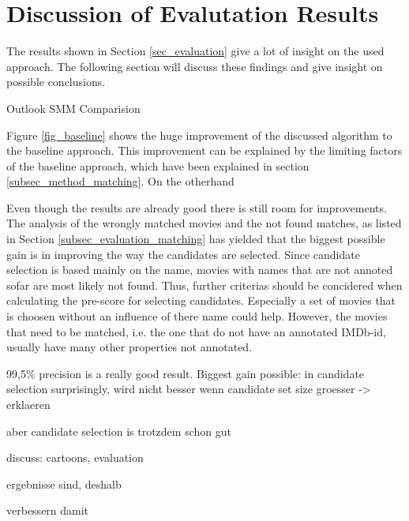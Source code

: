 \section{Discussion of Evalutation Results}
\label{sec_discussion}

The results shown in Section \ref{sec_evaluation} give a lot of insight on the used approach.
The following section will discuss these findings and give insight on possible conclusions.

Outlook SMM Comparision

Figure \ref{fig_baseline} shows the huge improvement of the discussed algorithm to the baseline approach.
This improvement can be explained by the limiting factors of the baseline approach, which have been explained in section \ref{subsec_method_matching}.
On the otherhand

Even though the results are already good there is still room for improvements.
The analysis of the wrongly matched movies and the not found matches, as listed in Section \ref{subsec_evaluation_matching} has yielded that the biggest possible gain is in improving the way the candidates are selected.
Since candidate selection is based mainly on the name, movies with names that are not annoted sofar are most likely not found.
Thus, further criterias should be concidered when calculating the pre-score for selecting candidates.
Especially a set of movies that is choosen without an influence of there name could help.
However, the movies that need to be matched, i.e. the one that do not have an annotated IMDb-id, usually have many other properties not annotated.

99,5\% precision is a really good result.
Biggest gain possible: in candidate selection
surprisingly, wird nicht besser wenn candidate set size groesser -> erklaeren

aber candidate selection is trotzdem schon gut

discuss: cartoons, evaluation

ergebnisse sind, deshalb

verbessern damit

